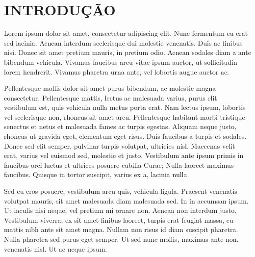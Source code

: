 \section{INTRODUÇÃO}
Lorem ipsum dolor sit amet, consectetur adipiscing elit. Nunc fermentum eu erat sed lacinia. Aenean interdum scelerisque dui molestie venenatis. Duis ac finibus nisi. Donec sit amet pretium mauris, in pretium odio. Aenean sodales diam a ante bibendum vehicula. Vivamus faucibus arcu vitae ipsum auctor, ut sollicitudin lorem hendrerit. Vivamus pharetra urna ante, vel lobortis augue auctor ac.

Pellentesque mollis dolor sit amet purus bibendum, ac molestie magna consectetur. Pellentesque mattis, lectus ac malesuada varius, purus elit vestibulum est, quis vehicula nulla metus porta erat. Nam lectus ipsum, lobortis vel scelerisque non, rhoncus sit amet arcu. Pellentesque habitant morbi tristique senectus et netus et malesuada fames ac turpis egestas. Aliquam neque justo, rhoncus ut gravida eget, elementum eget risus. Duis faucibus a turpis et sodales. Donec sed elit semper, pulvinar turpis volutpat, ultricies nisl. Maecenas velit erat, varius vel euismod sed, molestie et justo. Vestibulum ante ipsum primis in faucibus orci luctus et ultrices posuere cubilia Curae; Nulla laoreet maximus faucibus. Quisque in tortor suscipit, varius ex a, lacinia nulla.

Sed eu eros posuere, vestibulum arcu quis, vehicula ligula. Praesent venenatis volutpat mauris, sit amet malesuada diam malesuada sed. In in accumsan ipsum. Ut iaculis nisi neque, vel pretium mi ornare non. Aenean non interdum justo. Vestibulum viverra, ex sit amet finibus laoreet, turpis erat feugiat massa, eu mattis nibh ante sit amet magna. Nullam non risus id diam suscipit pharetra. Nulla pharetra sed purus eget semper. Ut sed nunc mollis, maximus ante non, venenatis nisl. Ut ac neque ipsum.